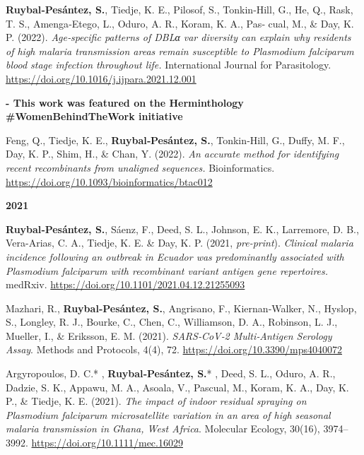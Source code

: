 \documentclass[11pt,a4paper,]{awesome-cv}
\begin{document}
\textbf{Ruybal‐Pesántez, S.}, Tiedje, K. E., Pilosof, S., Tonkin‐Hill,
G., He, Q., Rask, T. S., Amenga‐Etego, L., Oduro, A. R., Koram, K. A.,
Pas‐ cual, M., \& Day, K. P. (2022). \emph{Age‐specific patterns of DBLα
var diversity can explain why residents of high malaria transmission
areas remain susceptible to Plasmodium falciparum blood stage infection
throughout life.} International Journal for Parasitology.
\url{https://doi.org/10.1016/j.ijpara.2021.12.001}

\setlength{\leftskip}{2cm}

\textbf{- This work was featured on the Herminthology
\#WomenBehindTheWork initiative
\href{https://facebook.com/102760015458811/posts/151514423916703/?d=n}{\faExternalLink}}

Feng, Q., Tiedje, K. E., \textbf{Ruybal‐Pesántez, S.}, Tonkin‐Hill, G.,
Duffy, M. F., Day, K. P., Shim, H., \& Chan, Y. (2022). \emph{An
accurate method for identifying recent recombinants from unaligned
sequences.} Bioinformatics.
\url{https://doi.org/10.1093/bioinformatics/btac012}

\setlength{\leftskip}{0cm}

\textbf{2021}

\setlength{\leftskip}{1cm}

\textbf{Ruybal‐Pesántez, S.}, Sáenz, F., Deed, S. L., Johnson, E. K.,
Larremore, D. B., Vera-Arias, C. A., Tiedje, K. E. \& Day, K. P. (2021,
\emph{pre-print}). \emph{Clinical malaria incidence following an
outbreak in Ecuador was predominantly associated with Plasmodium
falciparum with recombinant variant antigen gene repertoires.} medRxiv.
\url{https://doi.org/10.1101/2021.04.12.21255093}

Mazhari, R., \textbf{Ruybal‐Pesántez, S.}, Angrisano, F.,
Kiernan‐Walker, N., Hyslop, S., Longley, R. J., Bourke, C., Chen, C.,
Williamson, D. A., Robinson, L. J., Mueller, I., \& Eriksson, E. M.
(2021). \emph{SARS‐CoV‐2 Multi‐Antigen Serology Assay}. Methods and
Protocols, 4(4), 72. \url{https://doi.org/10.3390/mps4040072}

Argyropoulos, D. C.* , \textbf{Ruybal‐Pesántez, S.}* , Deed, S. L.,
Oduro, A. R., Dadzie, S. K., Appawu, M. A., Asoala, V., Pascual, M.,
Koram, K. A., Day, K. P., \& Tiedje, K. E. (2021). \emph{The impact of
indoor residual spraying on Plasmodium falciparum microsatellite
variation in an area of high seasonal malaria transmission in Ghana,
West Africa}. Molecular Ecology, 30(16), 3974--3992.
\url{https://doi.org/10.1111/mec.16029}

\setlength{\leftskip}{2cm}
\end{document}
